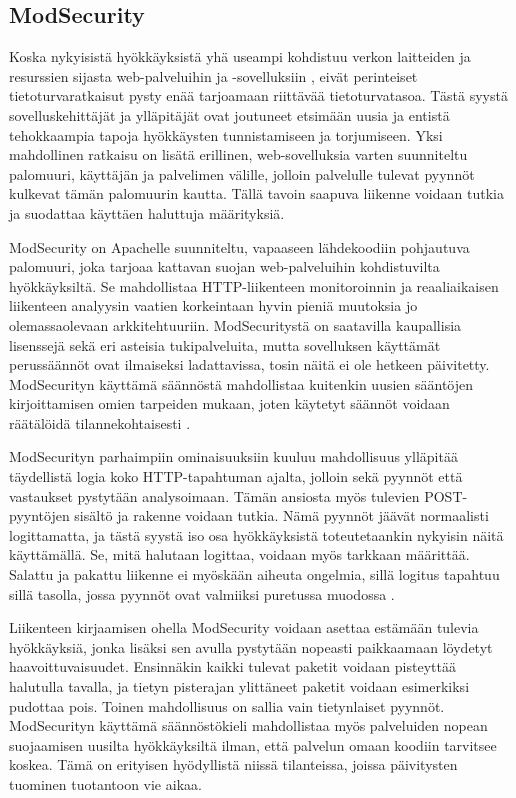 \subsection{ModSecurity}

Koska nykyisistä hyökkäyksistä yhä useampi kohdistuu verkon laitteiden ja resurssien sijasta web-palveluihin ja -sovelluksiin \cite{WASCb} \cite{SYM}, eivät perinteiset
tietoturvaratkaisut pysty enää tarjoamaan riittävää tietoturvatasoa. Tästä syystä sovelluskehittäjät ja ylläpitäjät ovat joutuneet etsimään uusia ja entistä tehokkaampia 
tapoja hyökkäysten tunnistamiseen ja torjumiseen. Yksi mahdollinen ratkaisu on lisätä erillinen, web-sovelluksia varten suunniteltu palomuuri, käyttäjän ja palvelimen 
välille, jolloin palvelulle tulevat pyynnöt kulkevat tämän palomuurin kautta. Tällä tavoin saapuva liikenne voidaan tutkia ja suodattaa käyttäen haluttuja määrityksiä. 

ModSecurity \cite{Mod} on Apachelle suunniteltu, vapaaseen lähdekoodiin pohjautuva palomuuri, joka tarjoaa kattavan suojan web-palveluihin kohdistuvilta hyökkäyksiltä. 
Se mahdollistaa HTTP-liikenteen monitoroinnin ja reaaliaikaisen liikenteen analyysin vaatien korkeintaan hyvin pieniä muutoksia jo olemassaolevaan arkkitehtuuriin.
ModSecuritystä on saatavilla kaupallisia lisenssejä sekä eri asteisia tukipalveluita, mutta sovelluksen käyttämät perussäännöt ovat ilmaiseksi ladattavissa, tosin näitä
ei ole hetkeen päivitetty. ModSecurityn käyttämä säännöstä mahdollistaa kuitenkin uusien sääntöjen kirjoittamisen omien tarpeiden mukaan, joten käytetyt säännöt voidaan räätälöidä 
tilannekohtaisesti \cite{Mod}. 

ModSecurityn parhaimpiin ominaisuuksiin kuuluu mahdollisuus ylläpitää täydellistä logia koko HTTP-tapahtuman ajalta, jolloin sekä pyynnöt että vastaukset pystytään analysoimaan.
Tämän ansiosta myös tulevien POST-pyyntöjen sisältö ja rakenne voidaan tutkia. Nämä pyynnöt jäävät normaalisti logittamatta, ja tästä syystä iso osa hyökkäyksistä toteutetaankin 
nykyisin näitä käyttämällä. Se, mitä halutaan logittaa, voidaan myös tarkkaan määrittää. Salattu ja pakattu liikenne ei myöskään aiheuta ongelmia, sillä logitus tapahtuu sillä tasolla,
jossa pyynnöt ovat valmiiksi puretussa muodossa \cite{Mod}.

Liikenteen kirjaamisen ohella ModSecurity voidaan asettaa estämään tulevia hyökkäyksiä, jonka lisäksi sen avulla pystytään nopeasti paikkaamaan löydetyt haavoittuvaisuudet. 
Ensinnäkin kaikki tulevat paketit voidaan pisteyttää halutulla tavalla, ja tietyn pisterajan ylittäneet paketit voidaan esimerkiksi pudottaa pois. Toinen mahdollisuus on sallia vain 
tietynlaiset pyynnöt. ModSecurityn käyttämä säännöstökieli mahdollistaa myös palveluiden nopean suojaamisen uusilta hyökkäyksiltä ilman, että palvelun omaan koodiin tarvitsee koskea.
Tämä on erityisen hyödyllistä niissä tilanteissa, joissa päivitysten tuominen tuotantoon vie aikaa. 
